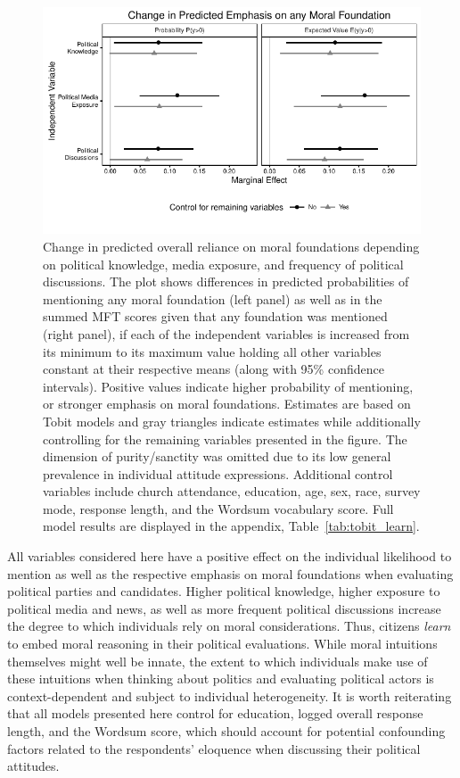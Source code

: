 \documentclass[12pt]{article}
\begin{document}
\begin{figure}[h]\centering
\includegraphics{../calc/fig/tobit_learn.pdf}
\caption{Change in predicted overall reliance on moral foundations depending on political knowledge, media exposure, and frequency of political discussions. The plot shows differences in predicted probabilities of mentioning any moral foundation (left panel) as well as in the summed MFT scores given that any foundation was mentioned (right panel), if each of the independent variables is increased from its minimum to its maximum value holding all other variables constant at their respective means (along with 95\% confidence intervals). Positive values indicate higher probability of mentioning, or stronger emphasis on moral foundations. Estimates are based on Tobit models and gray triangles indicate estimates while additionally controlling for the remaining variables presented in the figure. The dimension of purity/sanctity was omitted due to its low general prevalence in individual attitude expressions. Additional control variables include church attendance, education, age, sex, race, survey mode, response length, and the Wordsum vocabulary score. Full model results are displayed in the appendix, Table~\ref{tab:tobit_learn}.
}\label{fig:tobit_learn}
\end{figure}

All variables considered here have a positive effect on the individual likelihood to mention as well as the respective emphasis on moral foundations when evaluating political parties and candidates. Higher political knowledge, higher exposure to political media and news, as well as more frequent political discussions increase the degree to which individuals rely on moral considerations. Thus, citizens \textit{learn} to embed moral reasoning in their political evaluations. While moral intuitions themselves might well be innate, the extent to which individuals make use of these intuitions when thinking about politics and evaluating political actors is context-dependent and subject to individual heterogeneity. It is worth reiterating that all models presented here control for education, logged overall response length, and the Wordsum score, which should account for potential confounding factors related to the respondents' eloquence when discussing their political attitudes.
\end{document}
